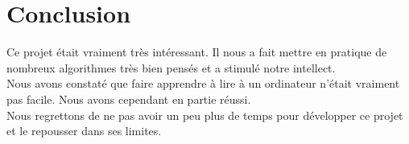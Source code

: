 \documentclass[12pt]{report}
\begin{document}
% 
% 










 






\chapter*{Conclusion}

Ce projet était vraiment très intéressant. Il nous a fait mettre en pratique de
nombreux algorithmes très bien pensés et a stimulé notre intellect. \\

Nous avons constaté que faire apprendre à lire à un ordinateur n'était vraiment
pas facile. Nous avons cependant en partie réussi. \\

Nous regrettons de ne pas avoir un peu plus de temps pour développer ce projet
et le repousser dans ses limites.
\end{document}
